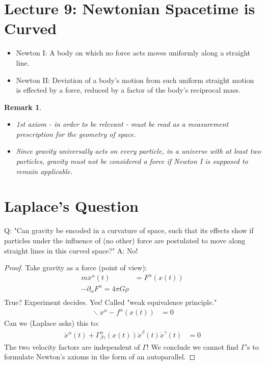 \documentclass[10pt, oneside]{article}
\newtheorem{remark}{Remark}
\begin{document}
\section{Lecture 9: Newtonian Spacetime is Curved}
  \begin{itemize}
  \item Newton I: A body on which no force acts moves uniformly along a straight line.
  \item Newton II: Deviation of a body's motion from such uniform straight motion is effected by a force, reduced by a factor of the body's reciprocal mass.
  \end{itemize}
  \begin{remark}
  \begin{itemize}
  \item 1st axiom - in order to be relevant - must be read as a measurement prescription for the geometry of space.
  \item Since gravity universally acts on every particle, in a universe with at least two particles, gravity must not be considered a force if Newton I is supposed to remain applicable.
  \end{itemize}
  \end{remark}
  \section{Laplace's Question}
  Q: "Can gravity be encoded in a curvature of space, such that its effects show if particles under the influence of (no other) force are postulated to move along straight lines in this curved space?"
  A: No!
  \begin{proof}
     Take gravity as a force (point of view):
     \begin{align*}
        m \ddot{x}^\alpha (t) &= F^\alpha(x(t)) \\
        - \partial_\alpha F^\alpha = 4 \pi G \rho \\
     \end{align*}
     True?
     Experiment decides.
     Yes!
     Called "weak equivalence principle."
     \begin{align*}
        \ddots{x}^\alpha - f^\alpha(x(t)) &= 0
     \end{align*}
     Can we  (Laplace asks) this to:
     \begin{align*}
        \ddot{x}^\alpha(t) + \Gamma^\alpha_{\beta \gamma} (x(t)) \dot{x}^\beta(t) \dot{x}^\gamma (t) &= 0
     \end{align*}
     The two velocity factors are independent of $\Gamma$! We conclude we cannot find $\Gamma$'s to formulate Newton's axioms in the form of an autoparallel.
  \end{proof}
\end{document}
